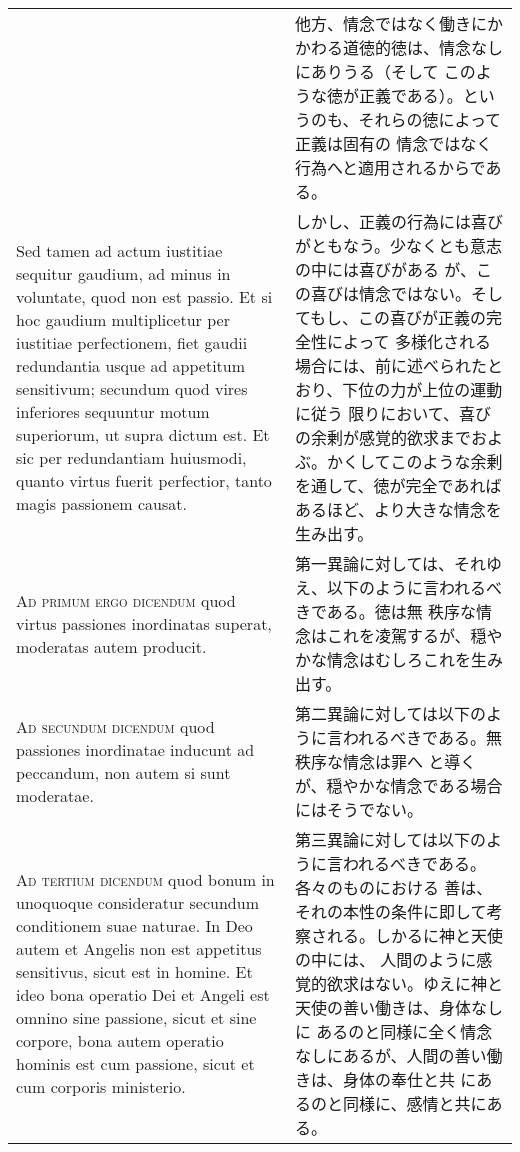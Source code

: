 \documentclass[10pt]{jsarticle}
\begin{document}
\begin{longtable}{p{21em}p{21em}}
&

他方、情念ではなく働きにかかわる道徳的徳は、情念なしにありうる（そして
このような徳が正義である）。というのも、それらの徳によって正義は固有の
情念ではなく行為へと適用されるからである。

 
\\

 Sed tamen ad actum iustitiae sequitur gaudium, ad minus in voluntate,
 quod non est passio. Et si hoc gaudium multiplicetur per iustitiae
 perfectionem, fiet gaudii redundantia usque ad appetitum sensitivum;
 secundum quod vires inferiores sequuntur motum superiorum, ut supra
 dictum est. Et sic per redundantiam huiusmodi, quanto virtus fuerit
 perfectior, tanto magis passionem causat.
 
&

しかし、正義の行為には喜びがともなう。少なくとも意志の中には喜びがある
が、この喜びは情念ではない。そしてもし、この喜びが正義の完全性によって
多様化される場合には、前に述べられたとおり、下位の力が上位の運動に従う
限りにおいて、喜びの余剰が感覚的欲求までおよぶ。かくしてこのような余剰
を通して、徳が完全であればあるほど、より大きな情念を生み出す。

 
\\



 {\scshape Ad primum ergo dicendum} quod virtus passiones inordinatas
 superat, moderatas autem producit.
 
&

 第一異論に対しては、それゆえ、以下のように言われるべきである。徳は無
 秩序な情念はこれを凌駕するが、穏やかな情念はむしろこれを生み出す。
 
\\




 {\scshape Ad secundum dicendum} quod passiones inordinatae inducunt
 ad peccandum, non autem si sunt moderatae.
 
&

 第二異論に対しては以下のように言われるべきである。無秩序な情念は罪へ
 と導くが、穏やかな情念である場合にはそうでない。
 
\\




 {\scshape Ad tertium dicendum} quod bonum in unoquoque consideratur
 secundum conditionem suae naturae. In Deo autem et Angelis non est
 appetitus sensitivus, sicut est in homine. Et ideo bona operatio Dei
 et Angeli est omnino sine passione, sicut et sine corpore, bona autem
 operatio hominis est cum passione, sicut et cum corporis ministerio.
 
 &

 第三異論に対しては以下のように言われるべきである。各々のものにおける
 善は、それの本性の条件に即して考察される。しかるに神と天使の中には、
 人間のように感覚的欲求はない。ゆえに神と天使の善い働きは、身体なしに
 あるのと同様に全く情念なしにあるが、人間の善い働きは、身体の奉仕と共
 にあるのと同様に、感情と共にある。
 
\end{longtable}
\end{document}
